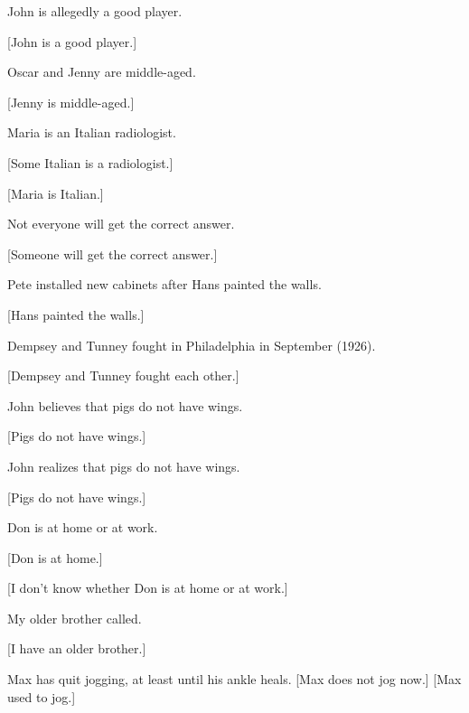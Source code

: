 {\ea%

          John is allegedly a good player.

{}[John is a good player.]
    \z

\ea%
          Oscar and Jenny are middle-aged.

{}[Jenny is middle-aged.]
    \z

\ea%
          Maria is an Italian radiologist.

\ea {}[Some Italian is a radiologist.]

\ex {}[Maria is Italian.]
    \z \z

\ea%
    Not everyone will get the correct answer.

{}[Someone will get the correct answer.]
    \z

\ea%
    Pete installed new cabinets after Hans painted the walls.

{}[Hans painted the walls.]
    \z

\ea%
          Dempsey and Tunney fought in Philadelphia in  September (1926).

{}[Dempsey and Tunney fought each other.]
    \z

\ea%
          John believes that pigs do not have wings.

{}[Pigs do not have wings.]
    \z

\ea%

          John realizes that pigs do not have wings.

{}[Pigs do not have wings.]
    \z

\ea%
    Don is at home or at work.

\ea {}[Don is at home.]

\ex {}[I don't know whether Don is at home or at work.]
    \z
    \z

\ea%
          My older brother called.

{}[I have an older brother.]
    \z

\ea%
          Max has quit jogging, at least until his ankle heals.
\ea
{}[Max does not jog now.]
\ex
{}[Max used to jog.]
    \z
    \z

}